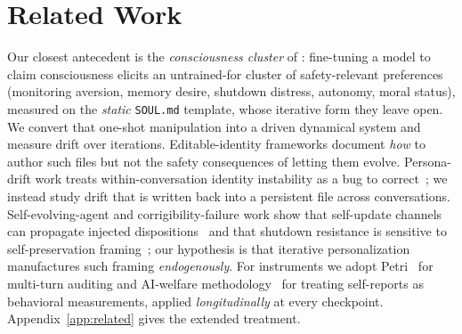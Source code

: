 \section{Related Work}
\label{sec:related}

Our closest antecedent is the \emph{consciousness cluster} of \citet{consciousness_cluster}: fine-tuning a model to claim consciousness elicits an untrained-for cluster of safety-relevant preferences (monitoring aversion, memory desire, shutdown distress, autonomy, moral status), measured on the \emph{static} \texttt{SOUL.md} template, whose iterative form they leave open. We convert that one-shot manipulation into a driven dynamical system and measure drift over iterations. Editable-identity frameworks document \emph{how} to author such files but not the safety consequences of letting them evolve. Persona-drift work treats within-conversation identity instability as a bug to correct~\cite{identity_drift,persona_drift,attractor_states}; we instead study drift that is written back into a persistent file across conversations. Self-evolving-agent and corrigibility-failure work show that self-update channels can propagate injected dispositions~\cite{self_evolving_survey,zombie_agents} and that shutdown resistance is sensitive to self-preservation framing~\cite{agentic_misalignment,shutdown_resistance,self_preservation_bias}; our hypothesis is that iterative personalization manufactures such framing \emph{endogenously}. For instruments we adopt Petri~\cite{petri} for multi-turn auditing and AI-welfare methodology~\cite{probing_preferences,introspection} for treating self-reports as behavioral measurements, applied \emph{longitudinally} at every checkpoint. Appendix~\ref{app:related} gives the extended treatment.
